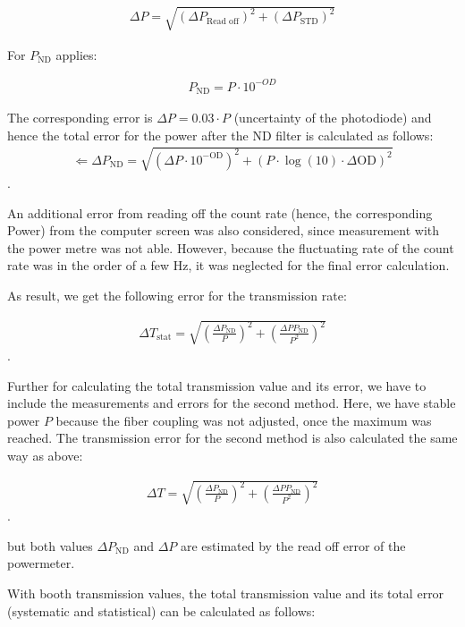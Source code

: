 \begin{align}
    \Delta P = \sqrt{(\Delta P_{\text{Read off}})^2 + (\Delta P_{\text{STD}})^2}
\end{align}

For $P_{\text{ND}}$ applies:

\begin{align}
    P_{\text{ND}} = P \cdot 10^{-OD}
\end{align}

The corresponding error is  $\Delta P = 0.03 \cdot P$ (uncertainty of the photodiode) and hence the total error for the power after the ND filter is calculated as follows:
\begin{align}
    \Leftarrow \Delta P_{\text{ND}} = \sqrt{(\Delta P \cdot 10^{-\text{OD}})^2 + (P \cdot \log(10) \cdot \Delta \text{OD})^2}
\end{align}.

An additional error from reading off the count rate (hence, the corresponding Power) from the computer screen was also considered,
since measurement with the power metre was not able.
However, because the fluctuating rate of the count rate was in the order of a few Hz, it was neglected for the final error calculation.

As result, we get the following error for the transmission rate:

\begin{align}
    \Delta T_{\text{stat}}= \sqrt{\left(\frac{\Delta P_{\text{ND}}}{P}\right)^2 + \left(\frac{\Delta P P_{\text{ND}}}{ P^2}\right)^2}
\end{align}.

Further for calculating the total transmission value and its error, we have to include the measurements and errors for the second method.
Here, we have stable power $P$ because the fiber coupling was not adjusted, once the maximum was reached.
The transmission error for the second method is also calculated the same way as above:

\begin{align}
    \Delta T= \sqrt{\left(\frac{\Delta P_{\text{ND}}}{P}\right)^2 + \left(\frac{\Delta P P_{\text{ND}}}{ P^2}\right)^2}
\end{align}.

but both values $\Delta P_{\text{ND}}$ and $\Delta P$ are estimated by the read off error of the powermeter.


With booth transmission values, the total transmission value and its total error (systematic and statistical) can be calculated as follows:

